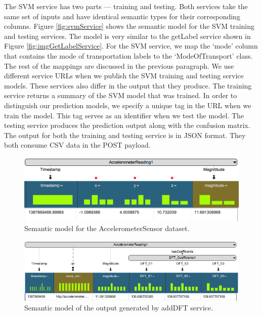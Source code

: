 The SVM service has two parts --- training and testing. Both  services take the same set of inputs and have identical semantic types for their corresponding columns. Figure \ref{fig:svmService} shows the semantic model for the SVM training and testing services. The model is very similar to the getLabel service shown in  Figure \ref{fig:imgGetLabelService}. For the SVM service, we map the `mode' column that contains the mode of transportation labels to the `ModeOfTransport' class. The rest of the mappings are discussed in the previous paragraph. We use different service URLs when we publish the SVM training and testing service models. These services also differ in the output that they produce. The training service returns a summary of the SVM model that was trained. In order to distinguish our prediction models, we specify a unique tag in the URL when we train the model. This tag serves as an identifier when we test the model. The testing service produces the prediction output along with the confusion matrix. The output for both the training and testing service is in JSON format. They both consume CSV data in the POST payload.

\begin{figure}[ht!]
\centering
\includegraphics[width=150mm]{img/AccelerometerReadingModel}
\caption{Semantic model for the AccelerometerSensor dataset.\label{fig:AccelerometerReadingModel}}
\end{figure}

\begin{figure}[b]
\centering
\includegraphics[width=180mm]{img/DFToutput}
\caption{Semantic model of the output generated by addDFT service. \label{fig:DFToutput}}
\end{figure}

